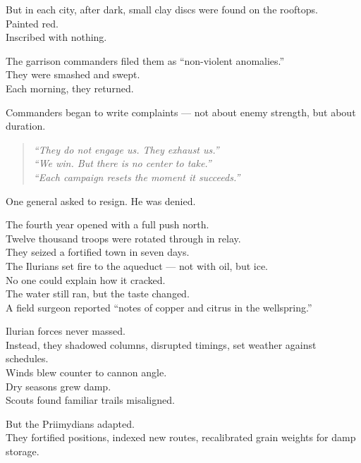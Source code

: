 \documentclass[12pt]{article}
\begin{document}
But in each city, after dark, small clay discs were found on the rooftops.\\
Painted red.\\
Inscribed with nothing.

The garrison commanders filed them as “non-violent anomalies.”\\
They were smashed and swept.\\
Each morning, they returned.

\vspace{1em}

Commanders began to write complaints — not about enemy strength, but about duration.

\begin{quote}
\textit{“They do not engage us. They exhaust us.”}\\
\textit{“We win. But there is no center to take.”}\\
\textit{“Each campaign resets the moment it succeeds.”}
\end{quote}

One general asked to resign. He was denied.

\vspace{1em}

The fourth year opened with a full push north.\\
Twelve thousand troops were rotated through in relay.\\
They seized a fortified town in seven days.\\
The Ilurians set fire to the aqueduct — not with oil, but ice.\\
No one could explain how it cracked.\\
The water still ran, but the taste changed.\\
A field surgeon reported “notes of copper and citrus in the wellspring.”

\vspace{1em}

Ilurian forces never massed.\\
Instead, they shadowed columns, disrupted timings, set weather against schedules.\\
Winds blew counter to cannon angle.\\
Dry seasons grew damp.\\
Scouts found familiar trails misaligned.

But the Priimydians adapted.\\
They fortified positions, indexed new routes, recalibrated grain weights for damp storage.
\end{document}
